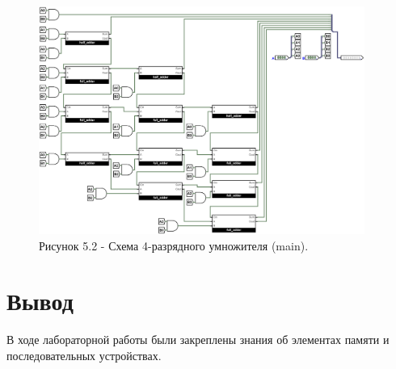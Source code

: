 \documentclass[oneside,a4paper,14pt]{extarticle}
\begin{document}
\begin{figure}[h!]
	\centering
	\includegraphics[width=0.95\textwidth]{pics/5_2.png}
	\caption*{Рисунок 5.2 - Схема 4-разрядного умножителя (main).}
\end{figure}

%

\newpage
\section*{Вывод}
В ходе лабораторной работы были закреплены знания об элементах памяти и последовательных устройствах.\\
\end{document}

